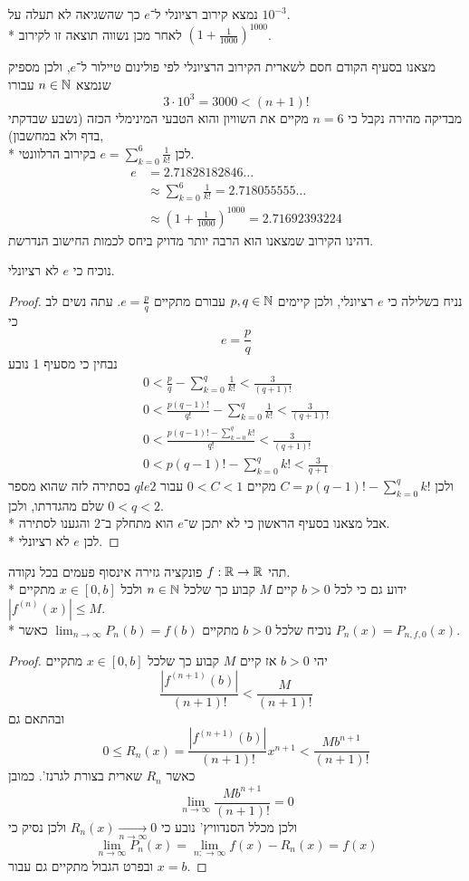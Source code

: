 \Subquestion{}
נמצא קירוב רציונלי ל־$e$ כך שהשגיאה לא תעלה על $10^{-3}$. \\*
לאחר מכן נשווה תוצאה זו לקירוב ${(1 + \frac{1}{1000})}^{1000}$.

מצאנו בסעיף הקודם חסם לשארית הקירוב הרציונלי לפי פולינום טיילור ל־$e$, ולכן מספיק שנמצא $n \in \mathbb{N}$ עבורו
\[
	3 \cdot 10^3 = 3000 < (n + 1)!
\]
מבדיקה מהירה נקבל כי $n = 6$ מקיים את השוויון והוא הטבעי המינימלי הכזה (נשבע שבדקתי בדף ולא במחשבון), \\*
לכן $e = \sum_{k = 0}^{6} \frac{1}{k!}$ בקירוב הרלוונטי.
\begin{align*}
	e & = 2.71828182846\dots \\
	& \approx \sum_{k = 0}^{6} \frac{1}{k!} = 2.718055555\dots \\
	& \approx {(1 + \frac{1}{1000})}^{1000} = 2.71692393224
\end{align*}
דהינו הקירוב שמצאנו הוא הרבה יותר מדויק ביחס לכמות החישוב הנדרשת.

\Subquestion{}
נוכיח כי $e$ לא רציונלי.
\begin{proof}
	נניח בשלילה כי $e$ רציונלי, ולכן קיימים $p, q \in \mathbb{N}$ עבורם מתקיים $e = \frac{p}{q}$.
	עתה נשים לב כי
	\[
		e = \frac{p}{q}
	\]
	נבחין כי מסעיף 1 נובע
	\begin{align*}
		0 < \frac{p}{q} - \sum_{k = 0}^{q} \frac{1}{k!} < \frac{3}{(q + 1)!} \\
		0 < \frac{p(q - 1)!}{q!} - \sum_{k = 0}^{q} \frac{1}{k!} < \frac{3}{(q + 1)!} \\
		0 < \frac{p(q - 1)! - \sum_{k = 0}^{q} k!}{q!} < \frac{3}{(q + 1)!} \\
		0 < p(q - 1)! - \sum_{k = 0}^{q} k! < \frac{3}{q + 1}
	\end{align*}
	ולכן $C = p(q - 1)! - \sum_{k = 0}^{q} k! $ מקיים $0 < C < 1$ עבור $q le 2$ בסתירה לזה שהוא מספר שלם מהגדרתו, ולכן $0 < q < 2$. \\*
	אבל מצאנו בסעיף הראשון כי לא יתכן ש־$e$ הוא מתחלק ב־$2$ והגענו לסתירה. \\*
	לכן $e$ לא רציונלי.
\end{proof}

\Question{}
תהי $f : \mathbb{R} \to \mathbb{R}$ פונקציה גזירה אינסוף פעמים בכל נקודה. \\*
ידוע גם כי לכל $b > 0$ קיים $M$ קבוע כך שלכל $n \in \mathbb{N}$ ולכל $x \in [0, b]$ מתקיים $|f^{(n)}(x)| \le M$. \\*
נוכיח שלכל $b > 0$ מתקיים $\lim_{n \to \infty} P_n(b) = f(b)$ כאשר $P_n(x) = P_{n, f, 0}(x)$.
\begin{proof}
	יהי $b > 0$ אז קיים $M$ קבוע כך שלכל $x \in [0, b]$ מתקיים
	\[
		\frac{|f^{(n + 1)}(b)|}{(n + 1)!} < \frac{M}{(n + 1)!}
	\]
	ובהתאם גם
	\[
		0 \le R_n(x) = \frac{|f^{(n + 1)}(b)|}{(n + 1)!}x^{n + 1} < \frac{M b^{n + 1}}{(n + 1)!}
	\]
	כאשר $R_n$ שארית בצורת לגרנז'.
	כמובן
	\[
		\lim_{n \to \infty} \frac{M b^{n + 1}}{(n + 1)!} = 0
	\]
	ולכן מכלל הסנדוויץ' נובע כי $R_n(x) \xrightarrow[n \to \infty]{} 0$ ולכן נסיק כי
	\[
		\lim_{n \to \infty} P_n(x) = \lim_{n; \to \infty} f(x) - R_n(x) = f(x)
	\]
	ובפרט הגבול מתקיים גם עבור $x = b$.
\end{proof}

